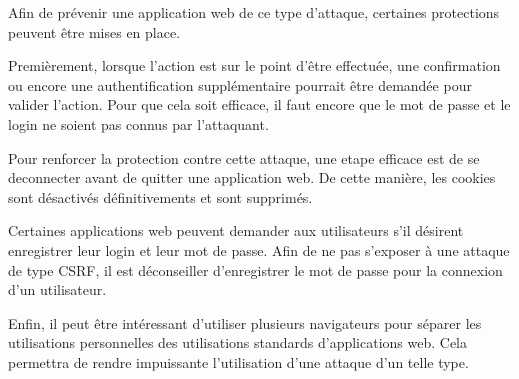 Afin de prévenir une application web de ce type d'attaque, certaines protections peuvent être mises en place.

Premièrement, lorsque l'action est sur le point d'être effectuée, une confirmation ou encore une authentification supplémentaire pourrait être demandée pour valider l'action. Pour que cela soit efficace, il faut encore que le mot de passe et le login ne soient pas connus par l'attaquant.

Pour renforcer la protection contre cette attaque, une etape efficace est de se deconnecter avant de quitter une application web. De cette manière, les cookies sont désactivés définitivements et sont supprimés.

Certaines applications web peuvent demander aux utilisateurs s'il désirent enregistrer leur login et leur mot de passe. Afin de ne pas s'exposer à une attaque de type CSRF, il est déconseiller d'enregistrer le mot de passe pour la connexion d'un utilisateur.

Enfin, il peut être intéressant d'utiliser plusieurs navigateurs pour séparer les utilisations personnelles des utilisations standards d'applications web. Cela permettra de rendre impuissante l'utilisation d'une attaque d'un telle type.




